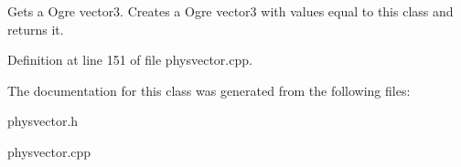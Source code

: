 Gets a Ogre vector3. Creates a Ogre vector3 with values equal to this class and returns it. 

Definition at line 151 of file physvector.cpp.

The documentation for this class was generated from the following files:\begin{DoxyCompactItemize}
\item 
physvector.h\item 
physvector.cpp\end{DoxyCompactItemize}
